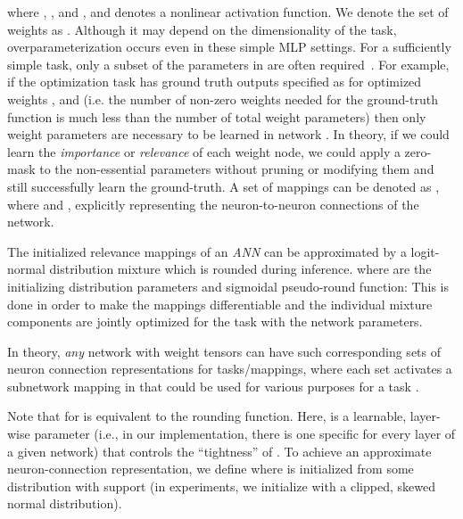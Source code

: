 \documentclass{article}
\begin{document}
where , , and , and  denotes a nonlinear activation function. We denote the set of weights as . Although it may depend on the dimensionality of the task, overparameterization occurs even in these simple MLP settings. For a sufficiently simple task, only a subset of the parameters in  are often required~\cite{frankle2019lottery}. For example, if the optimization task has ground truth outputs specified as  for optimized weights , and  (i.e. the number of non-zero weights needed for the ground-truth function is much less than the number of total weight parameters) then only  weight parameters are necessary to be learned in network . In theory, if we could learn the \textit{importance} or \textit{relevance} of each weight node, we could apply a zero-mask to the non-essential parameters without pruning or modifying them and still successfully learn the ground-truth. A set of mappings can be denoted as , where  and , explicitly representing the neuron-to-neuron connections of the network.
\iffalse
After learning this supposed task, if another mapping needs to be learned in addition to the  mapping, then we can zero-mask the parameters of  essential for the  mapping, leaving the rest of the   parameters for the new task, without affecting the previous task's performance. Additionally, we can choose to use the previous task parameters, in part or entirely, instead of masking them out. This would be inherently dependent on the similarity between tasks and data, data sequence, optimization methodology and initialization of the network.
\fi
The initialized relevance mappings of an \textit{ANN} can be approximated by a logit-normal distribution mixture which is rounded during inference. 
 where  are the initializing distribution parameters and  sigmoidal pseudo-round function: 
This is done in order to make the mappings differentiable and the individual mixture components are jointly optimized for the task with the network parameters.



In theory, \textit{any} network  with weight tensors  can have such corresponding sets of neuron connection representations  for  tasks/mappings, where each set  activates a subnetwork mapping in  that could be used for various purposes for a task .



Note that  for  is equivalent to the rounding function. Here,  is a learnable, layer-wise parameter (i.e., in our implementation, there is one specific  for every layer of a given network) that controls the ``tightness'' of . To achieve an approximate neuron-connection representation, we define  where  is initialized from some distribution with support  (in experiments, we initialize  with a clipped, skewed normal distribution). 
\end{document}
